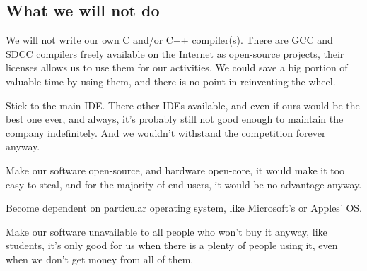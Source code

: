 \documentclass[a4paper,twoside,15pt]{book}
\begin{document}
		\subsection{What we will not do}
			\begin{dinglist}{73}
				\item We will not write our own C and/or C++ compiler(s). There are GCC and SDCC compilers freely available on the Internet as open-source projects, their licenses allows us to use them for our activities. We could save a big portion of valuable time by using them, and there is no point in reinventing the wheel.
				\item Stick to the main IDE. There other IDEs available, and even if ours would be the best one ever, and always, it's probably still not good enough to maintain the company indefinitely. And we wouldn't withstand the competition forever anyway.
				\item Make our software open-source, and hardware open-core, it would make it too easy to steal, and for the majority of end-users, it would be no advantage anyway.
				\item Become dependent on particular operating system, like Microsoft's or Apples' OS.
				\item Make our software unavailable to all people who won't buy it anyway, like students, it's only good for us when there is a plenty of people using it, even when we don't get money from all of them.
			\end{dinglist}
\end{document}
